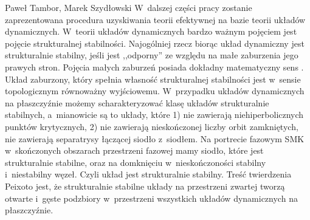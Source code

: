\begin{artplenv}{Paweł Tambor, Marek Szydłowski}
W~dalszej części pracy zostanie zaprezentowana procedura uzyskiwania teorii efektywnej na bazie teorii układów dynamicznych. W~teorii układów dynamicznych bardzo ważnym pojęciem jest pojęcie strukturalnej stabilności. Najogólniej rzecz biorąc układ dynamiczny jest strukturalnie stabilny, jeśli jest ,,odporny'' ze względu na małe zaburzenia jego prawych stron. Pojęcia małych zaburzeń posiada dokładny matematyczny sens
\parencite{tambor_czy_2017}.
Układ zaburzony, który spełnia własność strukturalnej stabilności jest w~sensie topologicznym równoważny wyjściowemu. W~przypadku układów dynamicznych na płaszczyźnie możemy scharakteryzować klasę układów strukturalnie stabilnych, a~mianowicie są to układy, które 1) nie zawierają niehiperbolicznych punktów krytycznych, 2) nie zawierają nieskończonej liczby orbit zamkniętych, nie zawierają separatrysy łączącej siodło z~siodłem. Na portrecie fazowym SMK w~skończonych obszarach przestrzeni fazowej mamy siodło, które jest strukturalnie stabilne, oraz na domknięciu w~nieskończoności stabilny i~niestabilny węzeł. Czyli układ jest strukturalnie stabilny. Treść twierdzenia Peixoto jest, że strukturalnie stabilne układy na przestrzeni zwartej tworzą otwarte i~gęste podzbiory w~przestrzeni wszystkich układów dynamicznych na płaszczyźnie.


\end{artplenv}
